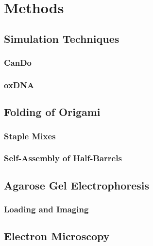 
\chapter{Methods}
\label{ch:methods}


\section{Simulation Techniques}
\label{sec:sim-techniques}

\subsection{CanDo}
\label{subsec:methods-cando}

\subsection{oxDNA}
\label{subsec:methods-oxdna}


\section{Folding of Origami}
\label{sec:folding-origami}

\subsection{Staple Mixes}
\label{subsec:staple-mixes}

\subsection{Self-Assembly of Half-Barrels}
\label{subsec:self-assembly}


\section{Agarose Gel Electrophoresis}
\label{sec:gel-electrophoresis}

\subsection{Loading and Imaging}
\label{subsec:gel-loading-imaging}


\section{Electron Microscopy}
\label{sec:electron-microscopy}
